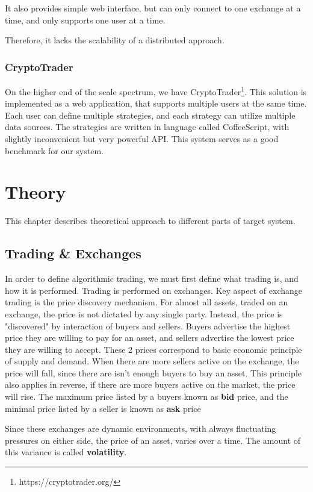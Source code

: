 It also provides simple web interface, but can only connect to one exchange at a time, and only supports one user at a time.

Therefore, it lacks the scalability of a distributed approach.

\subsection{CryptoTrader}
On the higher end of the scale spectrum, we have CryptoTrader\footnote{https://cryptotrader.org/}. This solution
is implemented as a web application, that supports multiple users at the same time. Each user can define multiple
strategies, and each strategy can utilize multiple data sources. The strategies are written in language called
CoffeeScript, with slightly inconvenient but very powerful API. This system serves as a good benchmark for
our system.


\chapter{Theory}
\label{chapter:theory}
This chapter describes theoretical approach to different parts of target system.
\section{Trading \& Exchanges}
In order to define algorithmic trading, we must first define what trading is, and how it is performed.
Trading is performed on exchanges. Key aspect of exchange trading is the price discovery mechanism. For almost all assets,
traded on an exchange, the price is not dictated by any single party. Instead, the price is "discovered" by interaction of
buyers and sellers. Buyers advertise the highest price they are willing to pay for an asset, and sellers advertise the lowest price
they are willing to accept. These 2 prices correspond to basic economic principle of supply and demand. When there are more sellers active
on the exchange, the price will fall, since there are isn't enough buyers to buy an asset. This principle also applies in reverse, if there are more
buyers active on the market, the price will rise.
The maximum price listed by a buyers known as \textbf{bid} price, and the minimal price listed by a seller is known as \textbf{ask} price

Since these exchanges are dynamic environments, with always fluctuating pressures on either side, the price of an asset, varies over a time.
The amount of this variance is called \textbf{volatility}.

